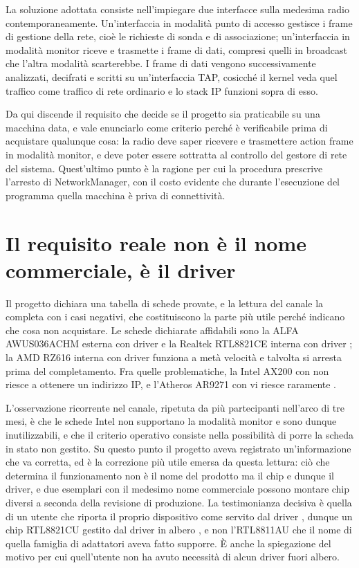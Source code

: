 La soluzione adottata consiste nell'impiegare due interfacce sulla medesima radio contemporaneamente. Un'interfaccia in modalità punto di accesso gestisce i frame di gestione della rete, cioè le richieste di sonda e di associazione; un'interfaccia in modalità monitor riceve e trasmette i frame di dati, compresi quelli in broadcast che l'altra modalità scarterebbe. I frame di dati vengono successivamente analizzati, decifrati e scritti su un'interfaccia TAP, cosicché il kernel veda quel traffico come traffico di rete ordinario e lo stack IP funzioni sopra di esso.

Da qui discende il requisito che decide se il progetto sia praticabile su una macchina data, e vale enunciarlo come criterio perché è verificabile prima di acquistare qualunque cosa: la radio deve saper ricevere e trasmettere action frame in modalità monitor, e deve poter essere sottratta al controllo del gestore di rete del sistema. Quest'ultimo punto è la ragione per cui la procedura prescrive l'arresto di NetworkManager, con il costo evidente che durante l'esecuzione del programma quella macchina è priva di connettività.

\section{Il requisito reale non è il nome commerciale, è il driver}

Il progetto dichiara una tabella di schede provate, e la lettura del canale la completa con i casi negativi, che costituiscono la parte più utile perché indicano che cosa non acquistare. Le schede dichiarate affidabili sono la ALFA AWUS036ACHM esterna con driver  e la Realtek RTL8821CE interna con driver ; la AMD RZ616 interna con driver  funziona a metà velocità e talvolta si arresta prima del completamento. Fra quelle problematiche, la Intel AX200 con  non riesce a ottenere un indirizzo IP, e l'Atheros AR9271 con  vi riesce raramente \cite{pmr-discord}.

L'osservazione ricorrente nel canale, ripetuta da più partecipanti nell'arco di tre mesi, è che le schede Intel non supportano la modalità monitor e sono dunque inutilizzabili, e che il criterio operativo consiste nella possibilità di porre la scheda in stato non gestito. Su questo punto il progetto aveva registrato un'informazione che va corretta, ed è la correzione più utile emersa da questa lettura: ciò che determina il funzionamento non è il nome del prodotto ma il chip e dunque il driver, e due esemplari con il medesimo nome commerciale possono montare chip diversi a seconda della revisione di produzione. La testimonianza decisiva è quella di un utente che riporta il proprio dispositivo come servito dal driver , dunque un chip RTL8821CU gestito dal driver in albero , e non l'RTL8811AU che il nome di quella famiglia di adattatori aveva fatto supporre. È anche la spiegazione del motivo per cui quell'utente non ha avuto necessità di alcun driver fuori albero.

